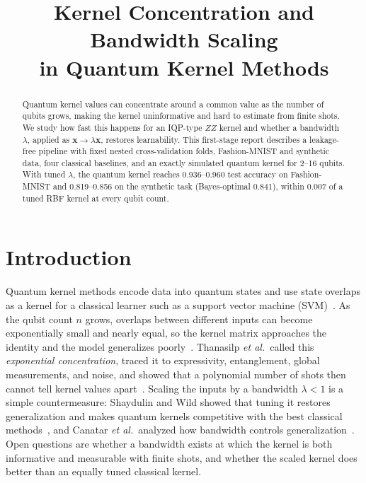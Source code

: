\documentclass[conference]{IEEEtran}
\begin{document}
\title{Kernel Concentration and Bandwidth Scaling\\in Quantum Kernel Methods}

\author{
}

\maketitle

\begin{abstract}
Quantum kernel values can concentrate around a common value as the number of qubits grows, making the kernel uninformative and hard to estimate from finite shots. We study how fast this happens for an IQP-type $ZZ$ kernel and whether a bandwidth $\lambda$, applied as $\mathbf{x}\to\lambda\mathbf{x}$, restores learnability. This first-stage report describes a leakage-free pipeline with fixed nested cross-validation folds, Fashion-MNIST and synthetic data, four classical baselines, and an exactly simulated quantum kernel for 2--16 qubits. With tuned $\lambda$, the quantum kernel reaches 0.936--0.960 test accuracy on Fashion-MNIST and 0.819--0.856 on the synthetic task (Bayes-optimal 0.841), within 0.007 of a tuned RBF kernel at every qubit count.
\end{abstract}

\section{Introduction}
Quantum kernel methods encode data into quantum states and use state overlaps as a kernel for a classical learner such as a support vector machine (SVM)~\cite{havlicek2019supervised,schuld2019feature}. As the qubit count $n$ grows, overlaps between different inputs can become exponentially small and nearly equal, so the kernel matrix approaches the identity and the model generalizes poorly~\cite{huang2021power}. Thanasilp \emph{et al.}\ called this \emph{exponential concentration}, traced it to expressivity, entanglement, global measurements, and noise, and showed that a polynomial number of shots then cannot tell kernel values apart~\cite{thanasilp2024concentration}. Scaling the inputs by a bandwidth $\lambda<1$ is a simple countermeasure: Shaydulin and Wild showed that tuning it restores generalization and makes quantum kernels competitive with the best classical methods~\cite{shaydulin2022bandwidth}, and Canatar \emph{et al.}\ analyzed how bandwidth controls generalization~\cite{canatar2022bandwidth}. Open questions are whether a bandwidth exists at which the kernel is both informative and measurable with finite shots, and whether the scaled kernel does better than an equally tuned classical kernel.
\end{document}
